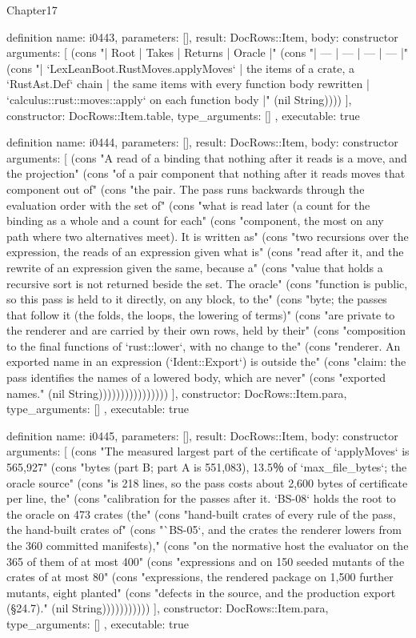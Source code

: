 \begin{lexlean}{Chapter17}
\begin{semanticmodule}
definition{
  name: i0443,
  parameters: [],
  result: DocRows::Item,
  body: constructor{
    arguments: [
      (cons "| Root | Takes | Returns | Oracle |" (cons "| --- | --- | --- | --- |" (cons "| `LexLeanBoot.RustMoves.applyMoves` | the items of a crate, a `RustAst.Def` chain | the same items with every function body rewritten | `calculus::rust::moves::apply` on each function body |" (nil String))))
    ],
    constructor: DocRows::Item.table,
    type_arguments: []
  },
  executable: true
}

definition{
  name: i0444,
  parameters: [],
  result: DocRows::Item,
  body: constructor{
    arguments: [
      (cons "A read of a binding that nothing after it reads is a move, and the projection" (cons "of a pair component that nothing after it reads moves that component out of" (cons "the pair. The pass runs backwards through the evaluation order with the set of" (cons "what is read later (a count for the binding as a whole and a count for each" (cons "component, the most on any path where two alternatives meet). It is written as" (cons "two recursions over the expression, the reads of an expression given what is" (cons "read after it, and the rewrite of an expression given the same, because a" (cons "value that holds a recursive sort is not returned beside the set. The oracle" (cons "function is public, so this pass is held to it directly, on any block, to the" (cons "byte; the passes that follow it (the folds, the loops, the lowering of terms)" (cons "are private to the renderer and are carried by their own rows, held by their" (cons "composition to the final functions of `rust::lower`, with no change to the" (cons "renderer. An exported name in an expression (`Ident::Export`) is outside the" (cons "claim: the pass identifies the names of a lowered body, which are never" (cons "exported names." (nil String))))))))))))))))
    ],
    constructor: DocRows::Item.para,
    type_arguments: []
  },
  executable: true
}

definition{
  name: i0445,
  parameters: [],
  result: DocRows::Item,
  body: constructor{
    arguments: [
      (cons "The measured largest part of the certificate of `applyMoves` is 565,927" (cons "bytes (part B; part A is 551,083), 13.5％ of `max_file_bytes`; the oracle source" (cons "is 218 lines, so the pass costs about 2,600 bytes of certificate per line, the" (cons "calibration for the passes after it. `BS-08` holds the root to the oracle on 473 crates (the" (cons "hand-built crates of every rule of the pass, the hand-built crates of" (cons "`BS-05`, and the crates the renderer lowers from the 360 committed manifests)," (cons "on the normative host the evaluator on the 365 of them of at most 400" (cons "expressions and on 150 seeded mutants of the crates of at most 80" (cons "expressions, the rendered package on 1,500 further mutants, eight planted" (cons "defects in the source, and the production export (§24.7)." (nil String)))))))))))
    ],
    constructor: DocRows::Item.para,
    type_arguments: []
  },
  executable: true
}


\end{semanticmodule}
\end{lexlean}
